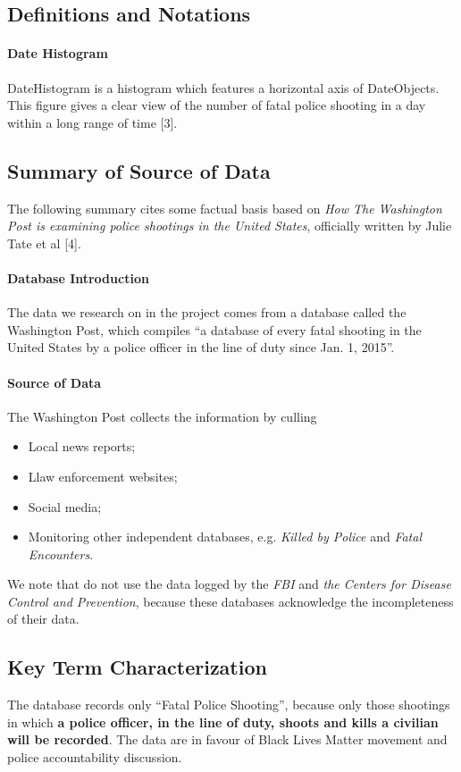 \documentclass[a4paper]{article}
\begin{document}
\subsection{Definitions and Notations}
\paragraph{Date Histogram} DateHistogram is a histogram which features a horizontal axis of DateObjects. This figure gives a clear view of the number of fatal police shooting in a day within a long range of time [3].

\subsection{Summary of Source of Data}
The following summary cites some factual basis based on \textit{How The Washington Post is examining police shootings in the United States}, officially written by Julie Tate et al [4].
\paragraph{Database Introduction}
The data we research on in the project comes from a database called the Washington Post, which compiles ``a database of every fatal shooting in the United States by a police officer in the line of duty since Jan. 1, 2015''.

\paragraph{Source of Data}
The Washington Post collects the information by culling
\begin{itemize}
\item Local news reports;
\item Llaw enforcement websites;
\item Social media;
\item Monitoring other independent databases, e.g. \textit{Killed by Police} and \textit{Fatal Encounters}.
\end{itemize}

We note that do not use the data logged by the \textit{FBI} and \textit{the Centers for Disease Control and Prevention}, because these databases acknowledge the incompleteness of their data.
\subsection{Key Term Characterization}
The database records only ``Fatal Police Shooting'', because only those shootings in which \textbf{a police officer, in the line of duty, shoots and kills a civilian will be recorded}. The data are in favour of Black Lives Matter movement and police accountability discussion. 
\end{document}
